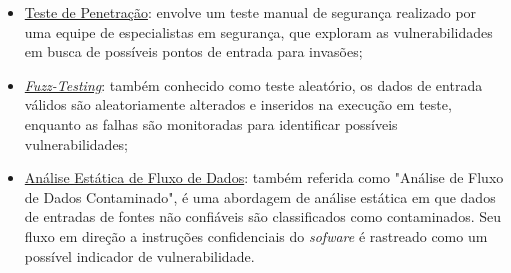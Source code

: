    \begin{itemize}
        \item \underline{Teste de Penetração}: envolve um teste manual de segurança realizado por uma equipe de especialistas em segurança, que exploram as vulnerabilidades em busca de possíveis pontos de entrada para invasões;
        \item \underline{\textit{Fuzz-Testing}}: também conhecido como teste aleatório, os dados de entrada válidos são aleatoriamente alterados e inseridos na execução em teste, enquanto as falhas são monitoradas para identificar possíveis vulnerabilidades;
        \item \underline{Análise Estática de Fluxo de Dados}: também referida como "Análise de Fluxo de Dados Contaminado", é uma abordagem de análise estática em que dados de entradas de fontes não confiáveis são classificados como contaminados. Seu fluxo em direção a instruções confidenciais do \textit{sofware} é rastreado como um possível indicador de vulnerabilidade.
    \end{itemize}
    
